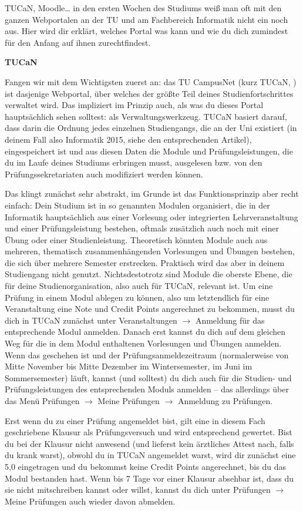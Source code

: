 {TUCaN, Moodle… in den ersten Wochen des Studiums weiß man oft mit den ganzen Webportalen an der TU und am Fachbereich Informatik nicht ein noch aus. Hier wird dir erklärt, welches Portal was kann und wie du dich zumindest für den Anfang auf ihnen zurechtfindest.
}{\noindent\textbf{TUCaN}

    Fangen wir mit dem Wichtigsten zuerst an: das TU CampusNet (kurz TUCaN, \footnotemark[1]) ist dasjenige Webportal, über welches der größte Teil deines Studienfortschrittes verwaltet wird. Das impliziert im Prinzip auch, als was du dieses Portal hauptsächlich sehen solltest: als Verwaltungswerkzeug. TUCaN basiert darauf, dass darin die Ordnung jedes einzelnen Studiengangs, die an der Uni existiert (in deinem Fall also Informatik 2015, siehe den entsprechenden Artikel), eingespeichert ist und aus diesen Daten die Module und Prüfungsleistungen, die du im Laufe deines Studiums erbringen musst, ausgelesen bzw. von den Prüfungssekretariaten auch modifiziert werden können.

    Das klingt zunächst sehr abstrakt, im Grunde ist das Funktionsprinzip aber recht einfach: Dein Studium ist in so genannten Modulen organisiert, die in der Informatik hauptsächlich aus einer Vorlesung oder integrierten Lehrveranstaltung und einer Prüfungsleistung bestehen, oftmals zusätzlich auch noch mit einer Übung oder einer Studienleistung. Theoretisch könnten Module auch aus mehreren, thematisch zusammenhängenden Vorlesungen und Übungen bestehen, die sich über mehrere Semester erstrecken. Praktisch wird das aber in deinem Studiengang nicht genutzt. Nichtsdestotrotz sind Module die oberste Ebene, die für deine Studienorganisation, also auch für TUCaN, relevant ist. Um eine Prüfung in einem Modul ablegen zu können, also um letztendlich für eine Veranstaltung eine Note und Credit Points angerechnet zu bekommen, musst du dich in TUCaN zunächst unter Veranstaltungen $\rightarrow$ Anmeldung für das entsprechende Modul anmelden. Danach erst kannst du dich auf dem gleichen Weg für die in dem Modul enthaltenen Vorlesungen und Übungen anmelden. Wenn das geschehen ist und der Prüfungsanmeldezeitraum (normalerweise von Mitte November bis Mitte Dezember im Wintersemester, im Juni im Sommersemester) läuft, kannst (und solltest) du dich auch für die Studien- und Prüfungsleistungen des entsprechenden Moduls anmelden – das allerdings über das Menü Prüfungen $\rightarrow$ Meine Prüfungen $\rightarrow$ Anmeldung zu Prüfungen.

    Erst wenn du zu einer Prüfung angemeldet bist, gilt eine in diesem Fach geschriebene Klausur als Prüfungsversuch und wird entsprechend gewertet. Bist du bei der Klausur nicht anwesend (und lieferst kein ärztliches Attest nach, falls du krank warst), obwohl du in TUCaN angemeldet warst, wird dir zunächst eine 5,0 eingetragen und du bekommst keine Credit Points angerechnet, bis du das Modul bestanden hast. Wenn bis 7 Tage vor einer Klausur absehbar ist, dass du sie nicht mitschreiben kannst oder willst, kannst du dich unter Prüfungen $\rightarrow$ Meine Prüfungen auch wieder davon abmelden.

}
